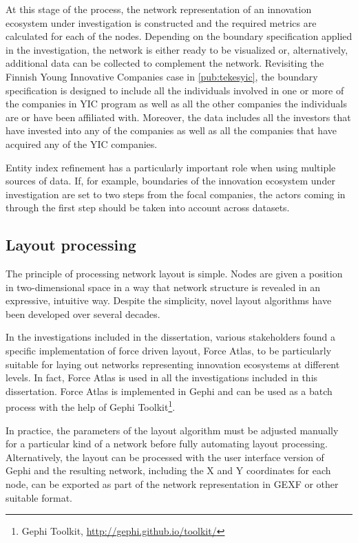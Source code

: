 At this stage of the process, the network representation of an innovation ecosystem under investigation is constructed and the required metrics are calculated for each of the nodes. Depending on the boundary specification applied in the investigation, the network is either ready to be visualized or, alternatively, additional data can be collected to complement the network. Revisiting the Finnish Young Innovative Companies case in \ref{pub:tekesyic}, the boundary specification is designed to include all the individuals involved in one or more of the companies in YIC program as well as all the other companies the individuals are or have been affiliated with. Moreover, the data includes all the investors that have invested into any of the companies as well as all the companies that have acquired any of the YIC companies.

Entity index refinement has a particularly important role when using multiple sources of data. If, for example, boundaries of the innovation ecosystem under investigation are set to two steps from the focal companies, the actors coming in through the first step should be taken into account across datasets.

\subsection{Layout processing}

The principle of processing network layout is simple. Nodes are given a position in two-dimensional space in a way that network structure is revealed in an expressive, intuitive way. Despite the simplicity, novel layout algorithms have been developed over several decades.

In the investigations included in the dissertation, various stakeholders found a specific implementation of force driven layout, Force Atlas, to be particularly suitable for laying out networks representing innovation ecosystems at different levels. In fact, Force Atlas is used in all the investigations included in this dissertation. Force Atlas is implemented in Gephi \citep{Bastian2009Gephi:Networks} and can be used as a batch process with the help of Gephi Toolkit\footnote{Gephi Toolkit, \url{http://gephi.github.io/toolkit/}}. 

In practice, the parameters of the layout algorithm must be adjusted manually for a particular kind of a network before fully automating layout processing. Alternatively, the layout can be processed with the user interface version of Gephi and the resulting network, including the X and Y coordinates for each node, can be exported as part of the network representation in GEXF or other suitable format.

